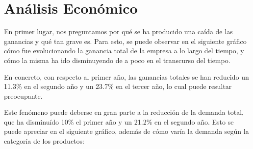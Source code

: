 \documentclass[12pt,a4paper]{article}
\begin{document}
\section{Análisis Económico}

En primer lugar, nos preguntamos por qué se ha producido una caída de las ganancias y qué tan grave es. Para esto, se puede observar 
en el siguiente gráfico cómo fue evolucionando la ganancia total de la empresa a lo largo del tiempo, y cómo la misma ha ido disminuyendo de a poco 
en el transcurso del tiempo.

\begin{center}
\end{center}

En concreto, con respecto al primer año, las ganancias totales se han reducido un 11.3\% en el segundo año y un 23.7\% en el tercer año, 
lo cual puede resultar preocupante.

\vspace{0.2cm}

Este fenómeno puede deberse en gran parte a la reducción de la demanda total, que ha disminuído 10\% el primer año y un 21.2\% en el segundo año. 
Esto se puede apreciar en el siguiente gráfico, además de cómo varía la demanda según la categoría de los productos:

\begin{center}
\end{center}
\end{document}
